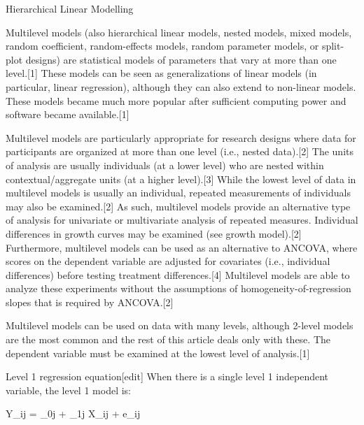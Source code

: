 Hierarchical Linear Modelling

Multilevel models (also hierarchical linear models, nested models, mixed models, random coefficient, random-effects models, random parameter models, or split-plot designs) are statistical models of parameters that vary at more than one level.[1] These models can be seen as generalizations of linear models (in particular, linear regression), although they can also extend to non-linear models. These models became much more popular after sufficient computing power and software became available.[1]

Multilevel models are particularly appropriate for research designs where data for participants are organized at more than one level (i.e., nested data).[2] The units of analysis are usually individuals (at a lower level) who are nested within contextual/aggregate units (at a higher level).[3] While the lowest level of data in multilevel models is usually an individual, repeated measurements of individuals may also be examined.[2] As such, multilevel models provide an alternative type of analysis for univariate or multivariate analysis of repeated measures. Individual differences in growth curves may be examined (see growth model).[2] Furthermore, multilevel models can be used as an alternative to ANCOVA, where scores on the dependent variable are adjusted for covariates (i.e., individual differences) before testing treatment differences.[4] Multilevel models are able to analyze these experiments without the assumptions of homogeneity-of-regression slopes that is required by ANCOVA.[2]

Multilevel models can be used on data with many levels, although 2-level models are the most common and the rest of this article deals only with these. The dependent variable must be examined at the lowest level of analysis.[1]


Level 1 regression equation[edit]
When there is a single level 1 independent variable, the level 1 model is:


 Y_{ij} = \beta_{0j} + \beta_{1j} X_{ij} + e_{ij}



